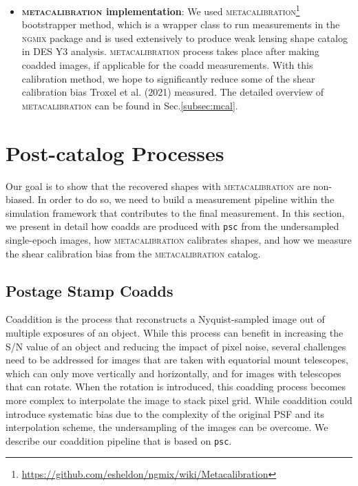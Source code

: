 \documentclass[fleqn,usenatbib]{mnras}
\begin{document}
\begin{itemize}
    \item \textbf{\textsc{metacalibration} implementation}: We used \textsc{metacalibration}\footnote{\url{https://github.com/esheldon/ngmix/wiki/Metacalibration}} bootstrapper method, which is a wrapper class to run measurements in the \textsc{ngmix} package and is used extensively to produce weak lensing shape catalog in DES Y3 analysis. \textsc{metacalibration} process takes place after making coadded images, if applicable for the coadd measurements. With this calibration method, we hope to significantly reduce some of the shear calibration bias Troxel et al. (2021) measured. The detailed overview of \textsc{metacalibration} can be found in Sec.\ref{subsec:mcal}. 
\end{itemize}



\section{Post-catalog Processes}
\label{sec:methods}
Our goal is to show that the recovered shapes with \textsc{metacalibration} are non-biased. In order to do so, we need to build a measurement pipeline within the simulation framework that contributes to the final measurement. In this section, we present in detail how coadds are produced with \texttt{psc} from the undersampled single-epoch images, how \textsc{metacalibration} calibrates shapes, and how we measure the shear calibration bias from the \textsc{metacalibration} catalog. 


\subsection{Postage Stamp Coadds}
\label{subsec:psc}
Coaddition is the process that reconstructs a Nyquist-sampled image out of multiple exposures of an object. While this process can benefit in increasing the S/N value of an object and reducing the impact of pixel noise, several challenges need to be addressed for images that are taken with equatorial mount telescopes, which can only move vertically and horizontally, and for images with telescopes that can rotate. When the rotation is introduced, this coadding process becomes more complex to interpolate the image to stack pixel grid. While coaddition could introduce systematic bias due to the complexity of the original PSF and its interpolation scheme, the undersampling of the images can be overcome. We describe our coaddition pipeline that is based on \texttt{psc}.
\end{document}
